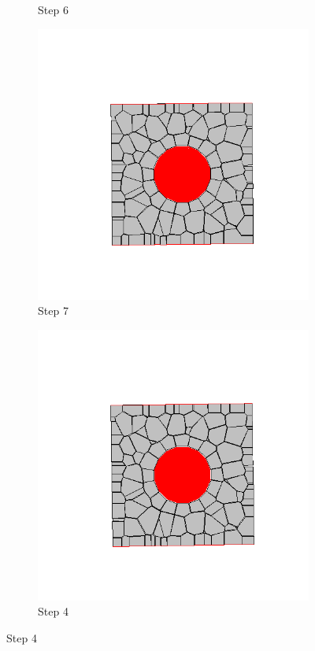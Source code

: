 \begin{figure}[ht!]
\begin{subfigure}{.25\textwidth}
      \caption{Step 6}
      \end{subfigure}%
      \begin{subfigure}{.25\textwidth}
        \centering
        \includegraphics[width=1.0\linewidth]{Files/Small_DEF/CR/DEP5-STEP(007).png}
      \caption{Step 7}
      \end{subfigure}%
      \begin{subfigure}{.25\textwidth}
        \centering
        \includegraphics[width=1.0\linewidth]{Files/Small_DEF/CR/DEP5-STEP(008).png}
      \caption{Step 4}
      \end{subfigure}


\end{figure}
